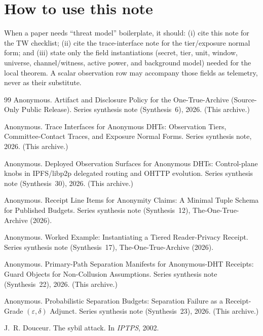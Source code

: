 \documentclass[11pt]{article}
\begin{document}
\section*{How to use this note}
When a paper needs ``threat model'' boilerplate, it should:
(i) cite this note for the TW checklist; (ii) cite the trace-interface note for the tier/exposure normal form; and
(iii) state only the field instantiations (secret, tier, unit, window, universe, channel/witness, active power, and background model) needed for the local theorem. A scalar observation row may accompany those fields as telemetry, never as their substitute.

\begin{thebibliography}{99}\small
{}
Anonymous.
\newblock Artifact and Disclosure Policy for the One-True-Archive (Source-Only Public Release).
\newblock Series synthesis note (Synthesis~6), 2026. (This archive.)

Anonymous.
\newblock Trace Interfaces for Anonymous DHTs: Observation Tiers, Committee-Contact Traces, and Exposure Normal Forms.
\newblock Series synthesis note, 2026. (This archive.)

Anonymous.
\newblock Deployed Observation Surfaces for Anonymous DHTs: Control-plane knobs in IPFS/libp2p delegated routing and OHTTP evolution.
\newblock Series synthesis note (Synthesis~30), 2026. (This archive.)


Anonymous.
\newblock Receipt Line Items for Anonymity Claims: A Minimal Tuple Schema for Published Budgets.
\newblock Series synthesis note (Synthesis~12), The-One-True-Archive (2026).

Anonymous.
\newblock Worked Example: Instantiating a Tiered Reader-Privacy Receipt.
\newblock Series synthesis note (Synthesis~17), The-One-True-Archive (2026).

Anonymous.
\newblock Primary-Path Separation Manifests for Anonymous-DHT Receipts: Guard Objects for Non-Collusion Assumptions.
\newblock Series synthesis note (Synthesis~22), 2026. (This archive.)

Anonymous.
\newblock Probabilistic Separation Budgets: Separation Failure as a Receipt-Grade $(\varepsilon,\delta)$ Adjunct.
\newblock Series synthesis note (Synthesis~23), 2026. (This archive.)

J.~R. Douceur.
\newblock The sybil attack.
\newblock In \emph{IPTPS}, 2002.


\end{thebibliography}
\end{document}
